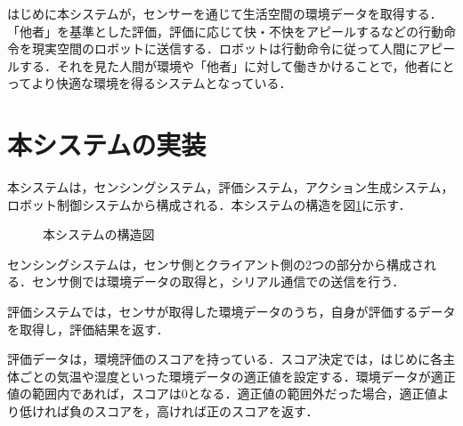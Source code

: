 \documentclass[paper=a4paper,jafontsize=9pt,head_space=15mm,gutter=20mm,
twocolumn,number_of_lines=49, line_length=26zw]{myuarticle}
\begin{document}
はじめに本システムが，センサーを通じて生活空間の環境データを取得する．「他者」を基準とした評価，評価に応じて快・不快をアピールするなどの行動命令を現実空間のロボットに送信する．ロボットは行動命令に従って人間にアピールする．それを見た人間が環境や「他者」に対して働きかけることで，他者にとってより快適な環境を得るシステムとなっている．

\section{本システムの実装}
本システムは，センシングシステム，評価システム，アクション生成システム，ロボット制御システムから構成される．本システムの構造を図\ref{fig:system-structure}に示す．

\fboxsep=0pt            %
\fboxrule=1pt            %
\begin{figure}[h]
  \centering
  \caption{本システムの構造図}
  \label{fig:system-structure}
\end{figure}

センシングシステムは，センサ側とクライアント側の2つの部分から構成される．センサ側では環境データの取得と，シリアル通信での送信を行う．

評価システムでは，センサが取得した環境データのうち，自身が評価するデータを取得し，評価結果を返す．

評価データは，環境評価のスコアを持っている．スコア決定では，はじめに各主体ごとの気温や湿度といった環境データの適正値を設定する．環境データが適正値の範囲内であれば，スコアは0となる．適正値の範囲外だった場合，適正値より低ければ負のスコアを，高ければ正のスコアを返す．
\end{document}
